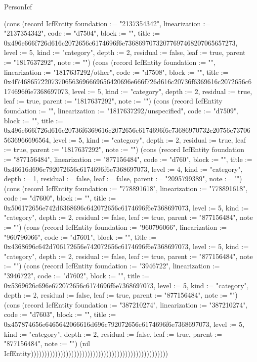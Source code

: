 \begin{lexlean}{PersonIcf}
\begin{semanticmodule}
{(cons (record IcfEntity {foundation := "2137354342", linearization := "2137354342", code := "d7504", block := "", title := 0x496e666f726d616c2072656c6174696f6e73686970732077697468207065657273, level := 5, kind := "category", depth := 2, residual := false, leaf := true, parent := "1817637292", note := ""}) (cons (record IcfEntity {foundation := "", linearization := "1817637292/other", code := "d7508", block := "", title := 0x4f746865722073706563696669656420696e666f726d616c20736f6369616c2072656c6174696f6e7368697073, level := 5, kind := "category", depth := 2, residual := true, leaf := true, parent := "1817637292", note := ""}) (cons (record IcfEntity {foundation := "", linearization := "1817637292/unspecified", code := "d7509", block := "", title := 0x496e666f726d616c20736f6369616c2072656c6174696f6e73686970732c20756e737065636966696564, level := 5, kind := "category", depth := 2, residual := true, leaf := true, parent := "1817637292", note := ""}) (cons (record IcfEntity {foundation := "877156484", linearization := "877156484", code := "d760", block := "", title := 0x46616d696c792072656c6174696f6e7368697073, level := 4, kind := "category", depth := 1, residual := false, leaf := false, parent := "2095799389", note := ""}) (cons (record IcfEntity {foundation := "778891618", linearization := "778891618", code := "d7600", block := "", title := 0x506172656e742d6368696c642072656c6174696f6e7368697073, level := 5, kind := "category", depth := 2, residual := false, leaf := true, parent := "877156484", note := ""}) (cons (record IcfEntity {foundation := "960796066", linearization := "960796066", code := "d7601", block := "", title := 0x4368696c642d706172656e742072656c6174696f6e7368697073, level := 5, kind := "category", depth := 2, residual := false, leaf := true, parent := "877156484", note := ""}) (cons (record IcfEntity {foundation := "3946722", linearization := "3946722", code := "d7602", block := "", title := 0x5369626c696e672072656c6174696f6e7368697073, level := 5, kind := "category", depth := 2, residual := false, leaf := true, parent := "877156484", note := ""}) (cons (record IcfEntity {foundation := "387210274", linearization := "387210274", code := "d7603", block := "", title := 0x457874656e6465642066616d696c792072656c6174696f6e7368697073, level := 5, kind := "category", depth := 2, residual := false, leaf := true, parent := "877156484", note := ""}) (nil IcfEntity)))))))))))))))))))))))))))))))))))))))))))))))))))
}


\end{semanticmodule}
\end{lexlean}
